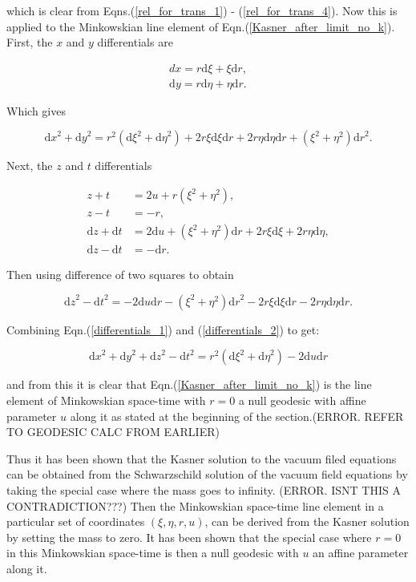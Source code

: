 \noindent which is clear from Eqns.(\ref{rel_for_trans_1}) - (\ref{rel_for_trans_4}). Now this is applied to the Minkowskian line element of Eqn.(\ref{Kasner_after_limit_no_k}). First, the $x$ and $y$ differentials are

\begin{eqnarray*} 
dx = r \mathrm{d}\xi + \xi \mathrm{d}r, \\
\mathrm{d}y = r \mathrm{d}\eta + \eta \mathrm{d}r. 
\end{eqnarray*} 

\noindent Which gives

\begin{equation}\label{differentials_1}
{\mathrm{d}x}^2 + {\mathrm{d}y}^2 = r^2 ({\mathrm{d}\xi}^2 + {\mathrm{d}\eta}^2) + 2 r \xi {\mathrm{d}\xi} {\mathrm{d}r} + 2 r \eta {\mathrm{d}\eta}{\mathrm{d}r} + (\xi^2 + \eta^2) {\mathrm{d}r}^2.
\end{equation}

\noindent Next, the $z$ and $t$ differentials

\begin{align*}
z + t & = 2 u + r (\xi^2 + \eta^2), \\
z - t & = - r, \\
{\mathrm{d}z} + {\mathrm{d}t} & = 2 \mathrm{d}u + (\xi^2 + \eta^2) \mathrm{d}r + 2 r \xi {\mathrm{d}\xi} + 2 r \eta {\mathrm{d}\eta}, \\
{\mathrm{d}z} - {\mathrm{d}t} & = - \mathrm{d}r. 
\end{align*}

\noindent Then using difference of two squares to obtain

\begin{equation}\label{differentials_2}
{\mathrm{d}z}^2 - {\mathrm{d}t}^2 = -2 {\mathrm{d}u}{\mathrm{d}r} - (\xi^2 + \eta^2) {\mathrm{d}r}^2 - 2 r \xi {\mathrm{d}\xi}{\mathrm{d}r} - 2 r \eta {\mathrm{d}\eta}{\mathrm{d}r}.
\end{equation}

\noindent Combining Eqn.(\ref{differentials_1}) and (\ref{differentials_2}) to get:

\begin{equation*}
{\mathrm{d}x}^2 + {\mathrm{d}y}^2 + {\mathrm{d}z}^2 - {\mathrm{d}t}^2 = r^2 ({\mathrm{d}\xi}^2 + {\mathrm{d}\eta}^2) - 2 {\mathrm{d}u}{\mathrm{d}r}
\end{equation*}

\noindent and from this it is clear that Eqn.(\ref{Kasner_after_limit_no_k}) is the line element of Minkowskian space-time with $r = 0$ a null geodesic with affine parameter $u$ along it as stated at the beginning of the section.(ERROR. REFER TO GEODESIC CALC FROM EARLIER)

Thus it has been shown that the Kasner solution to the vacuum filed equations can be obtained from the Schwarzschild solution of the vacuum field equations by taking the special case where the mass goes to infinity. (ERROR. ISNT THIS A CONTRADICTION???) Then the Minkowskian space-time line element in a particular set of coordinates $(\xi, \eta, r, u)$, can be derived from the Kasner solution by setting the mass to zero. It has been shown that the special case where $r=0$ in this Minkowskian space-time is then a null geodesic with $u$ an affine parameter along it.  
